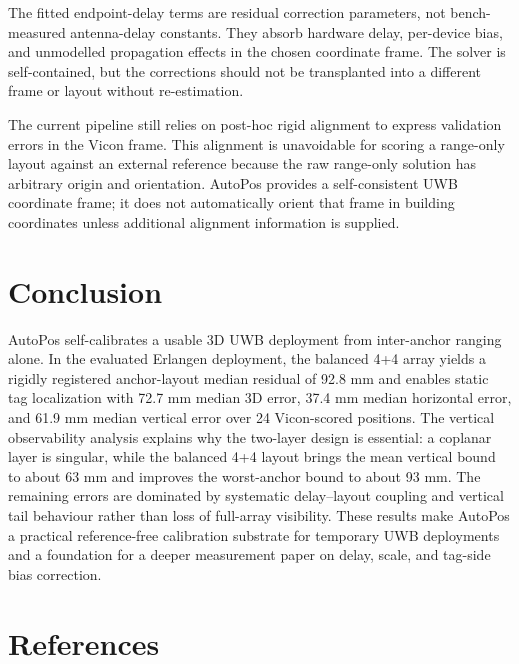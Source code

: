 \documentclass[journal,twoside,web]{ieeecolor}
\begin{document}
The fitted endpoint-delay terms are residual correction parameters, not bench-measured antenna-delay constants. They absorb hardware delay, per-device bias, and unmodelled propagation effects in the chosen coordinate frame. The solver is self-contained, but the corrections should not be transplanted into a different frame or layout without re-estimation.

The current pipeline still relies on post-hoc rigid alignment to express validation errors in the Vicon frame. This alignment is unavoidable for scoring a range-only layout against an external reference because the raw range-only solution has arbitrary origin and orientation. AutoPos provides a self-consistent UWB coordinate frame; it does not automatically orient that frame in building coordinates unless additional alignment information is supplied.

\section{Conclusion}
\label{sec:conclusion}

AutoPos self-calibrates a usable 3D UWB deployment from inter-anchor ranging alone. In the evaluated Erlangen deployment, the balanced 4+4 array yields a rigidly registered anchor-layout median residual of 92.8 mm and enables static tag localization with 72.7 mm median 3D error, 37.4 mm median horizontal error, and 61.9 mm median vertical error over 24 Vicon-scored positions. The vertical observability analysis explains why the two-layer design is essential: a coplanar layer is singular, while the balanced 4+4 layout brings the mean vertical bound to about 63 mm and improves the worst-anchor bound to about 93 mm. The remaining errors are dominated by systematic delay--layout coupling and vertical tail behaviour rather than loss of full-array visibility. These results make AutoPos a practical reference-free calibration substrate for temporary UWB deployments and a foundation for a deeper measurement paper on delay, scale, and tag-side bias correction.

\section*{References}



\end{document}
